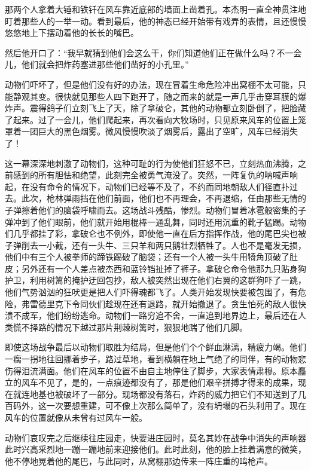 那两个人拿着大锤和铁钎在风车靠近底部的墙面上凿着孔。本杰明一直全神贯注地盯着那些人的一举一动。看到最后，他的神态已经开始带有戏弄的表情，且还慢慢悠悠地上下摆动着他的长长的嘴巴。

然后他开口了：“我早就猜到他们会这么干，你们知道他们正在做什么吗？不一会儿，他们就会把炸药塞进那些他们凿好的小孔里。”

动物们吓坏了，但是他们没有好的办法，现在冒着生命危险冲出窝棚不太可能，只能静观其变。很快就见那些人四下跑开了，随之而来的就是一声几乎击穿耳膜的爆炸声。震得鸽子们立刻飞上了天，除了拿破仑，其他的动物都立刻卧倒了，把脸藏了起来。过了一会儿，他们爬起来，再次看向大牧场时，只见原来风车的位置上笼罩着一团巨大的黑色烟雾。微风慢慢吹淡了烟雾后，露出了空旷，风车已经消失了！

这一幕深深地刺激了动物们，这种可耻的行为使他们狂怒不已，立刻热血沸腾，之前感到的所有胆怯和绝望，此刻完全被勇气淹没了。突然，一阵复仇的呐喊声响起，在没有命令的情况下，动物们已经等不及了，不约而同地朝敌人们径直扑过去。此次，枪林弹雨挡在他们前面，他们也不再理会，不再退缩，任由那些无情的子弹擦着他们的脑袋呼啸而去。这场战斗残酷，惨烈。动物们冒着冰雹般密集的子弹冲到了他们眼前，他们就开始用棍棒一通乱舞，同时还用沉重的靴子猛踢。动物们几乎都挂了彩，拿破仑也不例外，即使他一直在后方指挥作战，他的尾巴尖也被子弹削去一小截，还有一头牛、三只羊和两只鹅壮烈牺牲了。人也不是毫发无损，他们中有三个人被拳师的蹄铁踢破了脑袋；还有一个人被一头牛用犄角顶破了肚皮；另外还有一个人差点被杰西和蓝铃铛扯掉了裤子。拿破仑命令他那九只贴身狗护卫，利用树篱的掩护迂回包抄，敌人被突然出现在他们右翼的这群狗吓了一跳，他们气势汹汹的狂吠更是把人们吓得魂都飞了。人类开始发现快要被包围了，有危险，弗雷德里克下令同伙们趁现在还有退路，就开始撤退了。贪生怕死的敌人很快溃不成军，他们纷纷逃命。动物们一路穷追不舍，一直追到地界边上，最后还在人类慌不择路的情况下越过那片荆棘树篱时，狠狠地踹了他们几脚。

即使这场战争最后以动物们取胜为结局，但是他们个个鲜血淋漓，精疲力竭。他们一瘸一拐地往回挪着步子，路过草地，看到横躺在地上气绝了的同伴，有的动物悲伤得泪流满面。他们在风车的位置不由自主地停住了脚步，大家表情肃穆。原本矗立的风车不见了，是的，一点痕迹都没有了，那是他们艰辛拼搏才得来的成果，现在就连地基也被破坏了一部分。现场都没有落石，炸药的威力把它们不知送到了几百码外，这一次要想重建，可不像上次那么简单了，没有坍塌的石头利用了。现在风车的位置就像从未曾有过风车一般。

动物们哀叹完之后继续往庄园走，快要进庄园时，莫名其妙在战争中消失的声响器此时兴高采烈地一蹦一蹦地前来迎接他们。此时此刻，他的脸上挂着满意的微笑，他不停地晃着他的尾巴，与此同时，从窝棚那边传来一阵庄重的鸣枪声。

